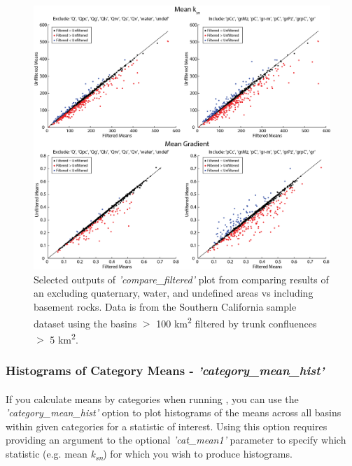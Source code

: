 \begin{figure}[H]
	\centering
	\includegraphics[width=16.5cm]{PNGs/Filtered_Basin_Comparison.png}
	\caption{Selected outputs of \textit{'compare\_filtered'} plot from  comparing results of an excluding quaternary, water, and undefined areas vs including basement rocks. Data is from the Southern California sample dataset using the basins $>$ 100 km\textsuperscript{2}  filtered by trunk confluences $>$ 5 km\textsuperscript{2}.}
	\label{fig:FiltBsnComp}
\end{figure}

\subsubsection{Histograms of Category Means - \textit{'category\_mean\_hist'}} \label{sec:cathist}
\paragraph{}If you calculate means by categories when running , you can use the \textit{'category\_mean\_hist'} option to plot histograms of the means across all basins within given categories for a statistic of interest. Using this option requires providing an argument to the optional \textit{'cat\_mean1'} parameter to specify which statistic (e.g. mean \textit{k\textsubscript{sn}}) for which you wish to produce histograms.

